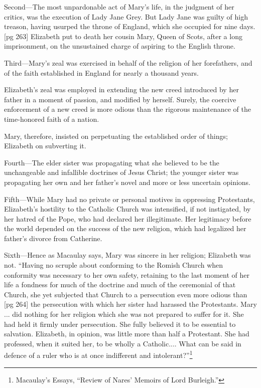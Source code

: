 Second—The most unpardonable act of Mary's
life, in the judgment of her critics, was the execution
of Lady Jane Grey. But Lady Jane was
guilty of high treason, having usurped the throne
of England, which she occupied for nine days.
[pg 263]
Elizabeth put to death her cousin Mary, Queen
of Scots, after a long imprisonment, on the unsustained
charge of aspiring to the English throne.

Third—Mary's zeal was exercised in behalf of
the religion of her forefathers, and of the faith
established in England for nearly a thousand
years.

Elizabeth's zeal was employed in extending the
new creed introduced by her father in a moment
of passion, and modified by herself. Surely, the
coercive enforcement of a new creed is more
odious than the rigorous maintenance of the time-honored
faith of a nation.

Mary, therefore, insisted on perpetuating the established
order of things; Elizabeth on subverting
it.

Fourth—The elder sister was propagating what
she believed to be the unchangeable and infallible
doctrines of Jesus Christ; the younger sister was
propagating her own and her father's novel and
more or less uncertain opinions.

Fifth—While Mary had no private or personal
motives in oppressing Protestants, Elizabeth's
hostility to the Catholic Church was intensified,
if not instigated, by her hatred of the Pope, who
had declared her illegitimate. Her legitimacy before
the world depended on the success of the new
religion, which had legalized her father's divorce
from Catherine.

Sixth—Hence as Macaulay says, Mary was sincere
in her religion; Elizabeth was not. “Having
no scruple about conforming to the Romish Church
when conformity was necessary to her own safety,
retaining to the last moment of her life a fondness
for much of the doctrine and much of the
ceremonial of that Church, she yet subjected that
Church to a persecution even more odious than
[pg 264]
the persecution with which her sister had harassed
the Protestants. Mary ... did nothing for her
religion which she was not prepared to suffer for
it. She had held it firmly under persecution. She
fully believed it to be essential to salvation.
Elizabeth, in opinion, was little more than half a
Protestant. She had professed, when it suited
her, to be wholly a Catholic.... What can be
said in defence of a ruler who is at once indifferent
and intolerant?”\footnote{Macaulay's Essays,
“Review of Nares' Memoirs of Lord
Burleigh.”}

